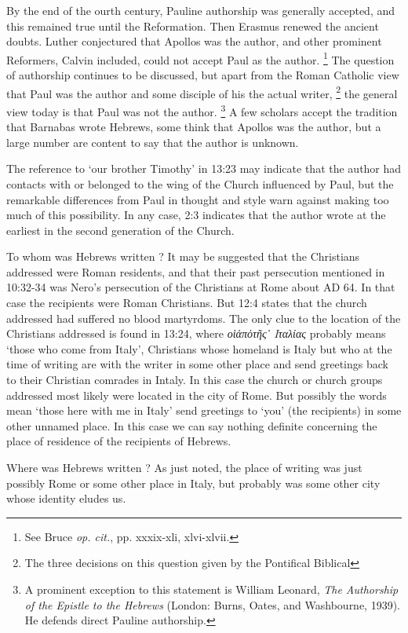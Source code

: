 By the end of the ourth century, Pauline authorship was generally accepted, and
this remained true until the Reformation.
Then Erasmus renewed the ancient doubts.
Luther conjectured that Apollos was the author, and other prominent Reformers,
Calvin included, could not accept Paul as the author.
\footnote{See Bruce {\it op. cit.}, pp. xxxix-xli, xlvi-xlvii.}
The question of authorship continues to be discussed, but apart from the Roman
Catholic view that Paul was the author and some disciple of his the actual
writer,
\footnote{The three decisions on this question given by the Pontifical
Biblical}
the general view today is that Paul was not the author.
\footnote{A prominent exception to this statement is William Leonard, {\it The
Authorship of the Epistle to the Hebrews} (London: Burns, Oates, and
Washbourne, 1939). He defends direct Pauline authorship.}
A few scholars accept the tradition that Barnabas wrote Hebrews, some think
that Apollos was the author, but a large number are content to say that the
author is unknown.

The reference to `our brother Timothy' in 13:23 may indicate that the author
had contacts with or belonged to the wing of the Church influenced by Paul, but
the remarkable differences from Paul in thought and style warn against making
too much of this possibility.
In any case, 2:3 indicates that the author wrote at the earliest in the
second generation of the Church.

To whom was Hebrews written ?
It may be suggested that the Christians addressed were Roman residents, and
that their past persecution mentioned in 10:32-34 was Nero's persecution of
the Christians at Rome about AD 64.
In that case the recipients were Roman Christians.
But 12:4 states that the church addressed had suffered no blood martyrdoms.
The only clue to the location of the Christians addressed is found in 13:24,
where {\it οὶἀπὀτῆς᾽ Ιταλίας} probably means `those who come from Italy',
Christians whose homeland is Italy but who at the time of writing are with the
writer in some other place and send greetings back to their Christian comrades
in Intaly.
In this case the church or church groups addressed most likely were located in
the city of Rome.
But possibly the words mean `those here with me in Italy' send greetings to
`you' (the recipients) in some other unnamed place.
In this case we can say nothing definite concerning the place of residence of
the recipients of Hebrews.

Where was Hebrews written ?
As just noted, the place of writing was just possibly Rome or some other place
in Italy, but probably was some other city whose identity eludes us.

